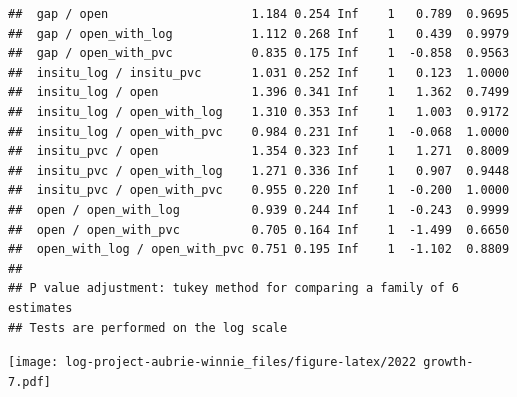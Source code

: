 \documentclass[
]{article}
\newenvironment{Shaded}{\begin{snugshade}}{\end{snugshade}}
\newcommand{\AttributeTok}[1]{\textcolor[rgb]{0.13,0.29,0.53}{#1}}
\newcommand{\ConstantTok}[1]{\textcolor[rgb]{0.56,0.35,0.01}{#1}}
\newcommand{\DecValTok}[1]{\textcolor[rgb]{0.00,0.00,0.81}{#1}}
\newcommand{\DocumentationTok}[1]{\textcolor[rgb]{0.56,0.35,0.01}{\textbf{\textit{#1}}}}
\newcommand{\FunctionTok}[1]{\textcolor[rgb]{0.13,0.29,0.53}{\textbf{#1}}}
\newcommand{\NormalTok}[1]{#1}
\newcommand{\OtherTok}[1]{\textcolor[rgb]{0.56,0.35,0.01}{#1}}
\newcommand{\SpecialCharTok}[1]{\textcolor[rgb]{0.81,0.36,0.00}{\textbf{#1}}}
\newcommand{\StringTok}[1]{\textcolor[rgb]{0.31,0.60,0.02}{#1}}
\begin{document}
\begin{verbatim}
##  gap / open                    1.184 0.254 Inf    1   0.789  0.9695
##  gap / open_with_log           1.112 0.268 Inf    1   0.439  0.9979
##  gap / open_with_pvc           0.835 0.175 Inf    1  -0.858  0.9563
##  insitu_log / insitu_pvc       1.031 0.252 Inf    1   0.123  1.0000
##  insitu_log / open             1.396 0.341 Inf    1   1.362  0.7499
##  insitu_log / open_with_log    1.310 0.353 Inf    1   1.003  0.9172
##  insitu_log / open_with_pvc    0.984 0.231 Inf    1  -0.068  1.0000
##  insitu_pvc / open             1.354 0.323 Inf    1   1.271  0.8009
##  insitu_pvc / open_with_log    1.271 0.336 Inf    1   0.907  0.9448
##  insitu_pvc / open_with_pvc    0.955 0.220 Inf    1  -0.200  1.0000
##  open / open_with_log          0.939 0.244 Inf    1  -0.243  0.9999
##  open / open_with_pvc          0.705 0.164 Inf    1  -1.499  0.6650
##  open_with_log / open_with_pvc 0.751 0.195 Inf    1  -1.102  0.8809
## 
## P value adjustment: tukey method for comparing a family of 6 estimates 
## Tests are performed on the log scale
\end{verbatim}

\begin{Shaded}
\end{Shaded}

\texttt{[image: log-project-aubrie-winnie\_files/figure-latex/2022 growth-7.pdf]}
\end{document}
